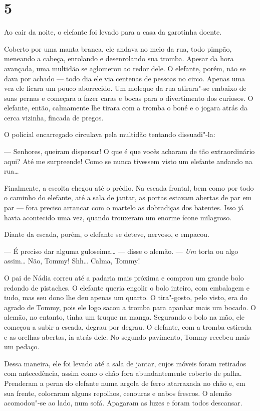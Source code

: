\section{5}

Ao cair da noite, o elefante foi levado para a casa da garotinha doente.

Coberto por uma manta branca, ele andava no meio da rua, todo pimpão,
meneando a cabeça, enrolando e desenrolando sua tromba. Apesar da hora
avançada, uma multidão se aglomerou ao redor dele. O elefante, porém,
não se dava por achado --- todo dia ele via centenas de pessoas no
circo. Apenas uma vez ele ficara um pouco aborrecido. Um moleque da rua
atirara"-se embaixo de suas pernas e começara a fazer caras e bocas para
o diverti­mento dos curiosos. O elefante, então, calmamente lhe tirara
com a tromba o boné e o jogara atrás da cerca vizinha, fincada de
pregos.

O policial encarregado circulava pela multidão tentando dissuadi"-la:

--- Senhores, queiram dispersar! O que é que vocês acharam de tão
extraordinário aqui? Até me surpreen­de! Como se nunca tivessem visto um
elefante andan­do na rua\ldots{}

Finalmente, a escolta chegou até o prédio. Na es­cada frontal, bem como
por todo o caminho do elefan­te, até a sala de jantar, as portas estavam
abertas de par em par --- fora preciso arrancar com o martelo as
dobradiças dos batentes. Isso já havia acontecido uma vez, quando
trouxeram um enorme ícone milagroso.

Diante da escada, porém, o elefante se deteve, nervoso, e empacou.

--- É preciso dar alguma guloseima\ldots{} --- disse o alemão. --- \emph{Um}
torta ou algo assim\ldots{} Não, Tommy! Shh\ldots{} Calma, Tommy!

O pai de Nádia correu até a padaria mais próxima e comprou um grande
bolo redondo de pistaches. O elefante queria engolir o bolo inteiro, com
embala­gem e tudo, mas seu dono lhe deu apenas um quarto. O tira"-gosto,
pelo visto, era do agrado de Tommy, pois ele logo sacou a tromba para
apanhar mais um bocado. O alemão, no entanto, tinha um truque na manga.
Se­gurando o bolo na mão, ele começou a subir a escada, degrau por
degrau. O elefante, com a tromba esticada e as orelhas abertas, ia atrás
dele. No segundo pavimento, Tommy recebeu mais um pedaço.

Dessa maneira, ele foi levado até a sala de jantar, cujos móveis foram
retirados com antecedência, assim como o chão fora abundantemente
coberto de palha. Prenderam a perna do elefante numa argola de ferro
atarraxada no chão e, em sua frente, colocaram alguns repolhos, cenouras
e nabos frescos. O alemão acomodou"-se ao lado, num sofá. Apagaram as
luzes e foram todos descansar.

